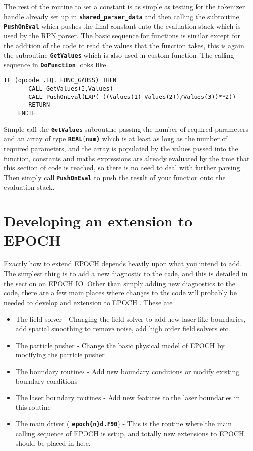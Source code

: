 \documentclass[12pt]{article}
\newcommand{\simpleboxverbatim}{\begin{Verbatim}[obeytabs=true,frame=single,
  framerule=0.5mm,rulecolor=\color{warwickmid}]}
\newcommand{\inlinecode}[1]{{\color{warwickred} \bf\texttt{#1}}}
\newcommand{\EPOCH}{{\color{warwickdark}\fontfamily{phv}\selectfont EPOCH} }
\begin{document}
The rest of the routine to set a constant is as simple as testing for the
tokenizer handle already set up in \inlinecode{shared\_parser\_data} and then
calling the subroutine \inlinecode{PushOnEval} which pushes the final constant
onto the evaluation stack which is used by the RPN parser. The basic sequence
for functions is similar except for the addition of the code to read the values
that the function takes, this is again the subroutine \inlinecode{GetValues}
which is also used in custom function. The calling sequence in
\inlinecode{DoFunction} looks like

\simpleboxverbatim
    IF (opcode .EQ. FUNC_GAUSS) THEN
       CALL GetValues(3,Values)
       CALL PushOnEval(EXP(-((Values(1)-Values(2))/Values(3))**2))
       RETURN
    ENDIF
\end{Verbatim}
Simple call the \inlinecode{GetValues} subroutine passing the number of
required parameters and an array of type \inlinecode{REAL(num)} which is at
least as long as the number of required parameters, and the array is populated
by the values passed into the function, constants and maths expressions are
already evaluated by the time that this section of code is reached, so there is
no need to deal with further parsing. Then simply call \inlinecode{PushOnEval}
to push the result of your function onto the evaluation stack.

\section{Developing an extension to \EPOCH}

Exactly how to extend \EPOCH depends heavily upon what you intend to add. The
simplest thing is to add a new diagnostic to the code, and this is detailed in
the section on \EPOCH IO. Other than simply adding new diagnostics to the code,
there are a few main places where changes to the code will probably be needed
to develop and extension to \EPOCH. These are
\begin{itemize}
\item The field solver - Changing the field solver to add new laser like
  boundaries, add spatial smoothing to remove noise, add high order field
  solvers etc.
\item The particle pusher - Change the basic physical model of \EPOCH by
  modifying the particle pusher
\item The boundary routines - Add new boundary conditions or modify existing
  boundary conditions
\item The laser boundary routines - Add new features to the laser boundaries in
  this routine
\item The main driver (\inlinecode{epoch\{n\}d.F90}) - This is the routine
  where the main calling sequence of \EPOCH is setup, and totally new
  extensions to \EPOCH should be placed in here.
\end{itemize}
\end{document}
